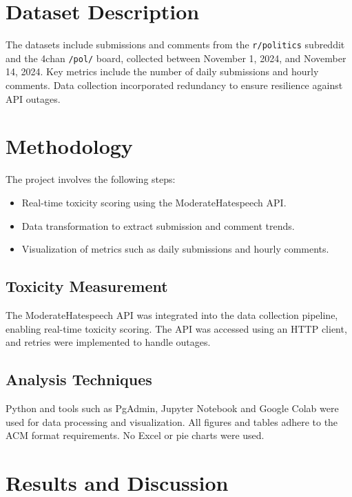 \documentclass[sigconf]{acmart}
\begin{document}
\section{Dataset Description}
The datasets include submissions and comments from the \texttt{r/politics} subreddit and the 4chan \texttt{/pol/} board, collected between November 1, 2024, and November 14, 2024. Key metrics include the number of daily submissions and hourly comments. Data collection incorporated redundancy to ensure resilience against API outages.

\section{Methodology}
The project involves the following steps:
\begin{itemize}
    \item Real-time toxicity scoring using the ModerateHatespeech API.
    \item Data transformation to extract submission and comment trends.
    \item Visualization of metrics such as daily submissions and hourly comments.
\end{itemize}

\subsection{Toxicity Measurement}
The ModerateHatespeech API was integrated into the data collection pipeline, enabling real-time toxicity scoring. The API was accessed using an HTTP client, and retries were implemented to handle outages.

\subsection{Analysis Techniques}
Python and tools such as PgAdmin, Jupyter Notebook and Google Colab were used for data processing and visualization. All figures and tables adhere to the ACM format requirements. No Excel or pie charts were used.

\section{Results and Discussion}
\end{document}
